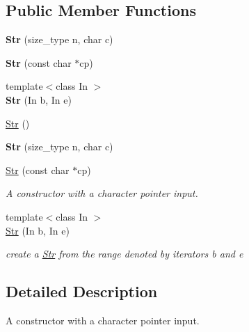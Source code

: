 \subsection*{Public Member Functions}
\begin{DoxyCompactItemize}
\item 
\mbox{\label{classStr_afedfc049e090cc83be3ea834948f28ba}} 
{\bfseries Str} (size\+\_\+type n, char c)
\item 
\mbox{\label{classStr_a8235816d2687bf223490568a18124cf4}} 
{\bfseries Str} (const char $\ast$cp)
\item 
\mbox{\label{classStr_a92caed2384063dca67f93a9788ed1115}} 
{\footnotesize template$<$class In $>$ }\\{\bfseries Str} (In b, In e)
\item 
\hyperlink{classStr_a51d07a34edbcb6ab60c23c0a1f6d2625}{Str} ()
\item 
\mbox{\label{classStr_afedfc049e090cc83be3ea834948f28ba}} 
{\bfseries Str} (size\+\_\+type n, char c)
\item 
\hyperlink{classStr_a8235816d2687bf223490568a18124cf4}{Str} (const char $\ast$cp)
\begin{DoxyCompactList}\small\item\em A constructor with a character pointer input. \end{DoxyCompactList}\item 
\mbox{\label{classStr_a92caed2384063dca67f93a9788ed1115}} 
{\footnotesize template$<$class In $>$ }\\\hyperlink{classStr_a92caed2384063dca67f93a9788ed1115}{Str} (In b, In e)
\begin{DoxyCompactList}\small\item\em create a \hyperlink{classStr}{Str} from the range denoted by iterators b and e \end{DoxyCompactList}\end{DoxyCompactItemize}


\subsection{Detailed Description}
A constructor with a character pointer input. 



